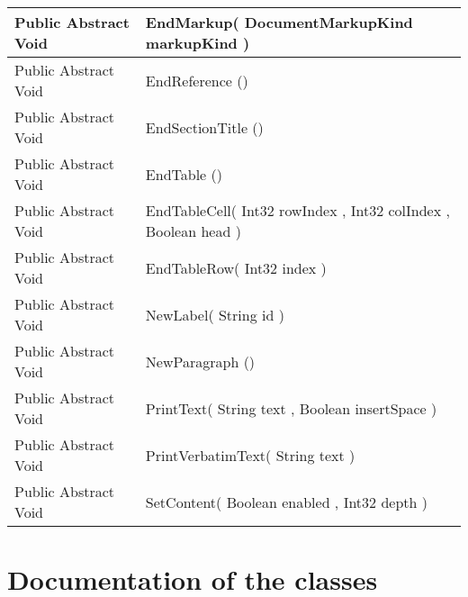\documentclass[11pt, oneside, a4paper]{book}
\begin{document}
\begin{center}
\begin{tabular}{| p{3cm} | p{12cm} | }
\hline
 Public  Abstract  Void &  EndMarkup(\hypertarget{SoftwareEngineeringTools.{}Documentation.{}IDocumentGenerator.{}EndMarkup\_DocumentMarkupKind}{} DocumentMarkupKind  markupKind  )\\
\hline
 Public  Abstract  Void &  EndReference ()\hypertarget{SoftwareEngineeringTools.{}Documentation.{}IDocumentGenerator.{}EndReference}{}\\
\hline
 Public  Abstract  Void &  EndSectionTitle ()\hypertarget{SoftwareEngineeringTools.{}Documentation.{}IDocumentGenerator.{}EndSectionTitle}{}\\
\hline
 Public  Abstract  Void &  EndTable ()\hypertarget{SoftwareEngineeringTools.{}Documentation.{}IDocumentGenerator.{}EndTable}{}\\
\hline
 Public  Abstract  Void &  EndTableCell(\hypertarget{SoftwareEngineeringTools.{}Documentation.{}IDocumentGenerator.{}EndTableCell\_Int32\_Int32\_Boolean}{} Int32  rowIndex  ,  Int32  colIndex  ,  Boolean  head  )\\
\hline
 Public  Abstract  Void &  EndTableRow(\hypertarget{SoftwareEngineeringTools.{}Documentation.{}IDocumentGenerator.{}EndTableRow\_Int32}{} Int32  index  )\\
\hline
 Public  Abstract  Void &  NewLabel(\hypertarget{SoftwareEngineeringTools.{}Documentation.{}IDocumentGenerator.{}NewLabel\_String}{} String  id  )\\
\hline
 Public  Abstract  Void &  NewParagraph ()\hypertarget{SoftwareEngineeringTools.{}Documentation.{}IDocumentGenerator.{}NewParagraph}{}\\
\hline
 Public  Abstract  Void &  PrintText(\hypertarget{SoftwareEngineeringTools.{}Documentation.{}IDocumentGenerator.{}PrintText\_String\_Boolean}{} String  text  ,  Boolean  insertSpace  )\\
\hline
 Public  Abstract  Void &  PrintVerbatimText(\hypertarget{SoftwareEngineeringTools.{}Documentation.{}IDocumentGenerator.{}PrintVerbatimText\_String}{} String  text  )\\
\hline
 Public  Abstract  Void &  SetContent(\hypertarget{SoftwareEngineeringTools.{}Documentation.{}IDocumentGenerator.{}SetContent\_Boolean\_Int32}{} Boolean  enabled  ,  Int32  depth  )\\
\hline
\end{tabular}
\end{center}
 


\chapter{Documentation of the classes}
\end{document}
